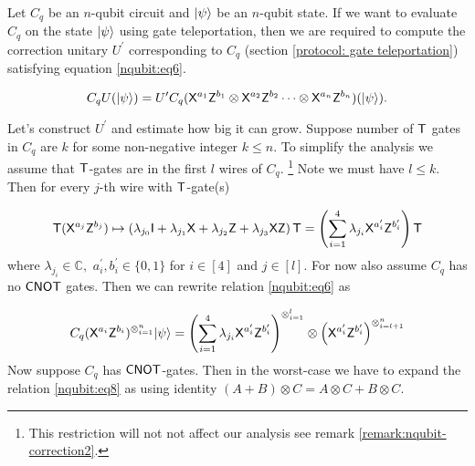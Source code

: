 Let $C_q$ be an $n$-qubit circuit and ${\lvert}\psi\rangle$ be an $n$-qubit state. If we want to evaluate $C_q$ on the state ${\lvert}\psi\rangle$ using gate teleportation, then we are required to compute the correction unitary $U^\prime$ corresponding to $C_q$ (section \ref{protocol: gate  teleportation}) satisfying equation \ref{nqubit:eq6}.

\begin{equation}
\label{nqubit:eq6}
C_qU({\lvert}\psi\rangle)= U^\prime C_q ({\sf X}^{a_{1}}{\sf Z}^{b_{1}}\otimes {\sf X}^{a_{2}}{\sf Z}^{b_{2}}\cdots \otimes {\sf X}^{a_{n}}{\sf Z}^{b_{n}})({\lvert}\psi\rangle).
\end{equation}


Let's construct $U^\prime$ and estimate how big it can grow. Suppose number of ${\sf T}$ gates in $C_q$ are $k$ for some non-negative integer $k\leq n.$ To simplify the analysis we assume that ${\sf T}$-gates are in the first $l$ wires of $C_q.$ \footnote{This restriction will not not affect our analysis see  remark \ref{remark:nqubit-correction2}.} Note we must have $l\leq k.$ Then for every $j$-th wire with ${\sf T}$-gate(s)

\begin{equation}
\begin{aligned}
\label{nqubit:eq7}
{\sf T}({\sf X}^{a_{j}}{\sf Z}^{b_{j}})\mapsto \left(\lambda_{j_0} {\sf I} + \lambda_{j_1} {\sf X} + \lambda_{j_2} {\sf Z} + \lambda_{j_3} {\sf X} {\sf Z} \right){\sf T}=\left(\sum_{i=1}^4 \lambda_{j_i} {\sf X}^{a_{i}^\prime}{\sf Z}^{b_{i}^\prime}\right){\sf T}\\
 \end{aligned}
\end{equation}
where $\lambda_{j_i}\in\mathbb{C}, $  $a_{i}^\prime, b_{i}^\prime \in\{0,1\}$ for $i\in[4]$ and $j\in[l].$ For now also assume $C_q$ has no ${\sf CNOT}$ gates. Then we can rewrite relation \ref{nqubit:eq6} as 


\begin{equation}
\label{nqubit:eq8}
\begin{aligned}
 C_q ({\sf X}^{a_{i}}{\sf Z}^{b_{i}})^{\otimes_{i=1}^{n}}{\lvert}\psi\rangle= \left(\sum_{i=1}^4 \lambda_{j_i} {\sf X}^{a_{i}^\prime}{\sf Z}^{b_{i}^\prime}\right)^{\otimes_{i=1}^{l}} \otimes \left({\sf X}^{a_{i}^\prime}{\sf Z}^{b_{i}^\prime}\right)^{\otimes_{i=l+1}^{n}}\\
\end{aligned}
\end{equation}
Now suppose $C_q$ has ${\sf CNOT}$-gates. Then in the worst-case we have to expand the relation \ref{nqubit:eq8} as using identity $(A+B)\otimes C=A\otimes C + B\otimes C.$

